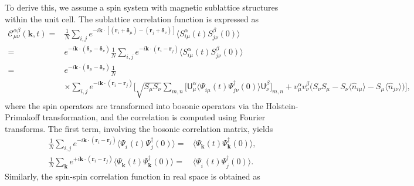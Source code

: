 \documentclass[aps, prx, nofootinbib, superscriptaddress]{revtex4-2}
\newcommand{\kvec}{\mathbf{k}}
\begin{document}
To derive this, we assume a spin system with magnetic sublattice structures within the unit cell. The sublattice correlation function is expressed as
\begin{align}
    \mathcal{C}^{\alpha\beta}_{\mu\nu} (\kvec, t) 
    = & \frac{1}{N} \sum_{i,j} e^{ - i \kvec \cdot [(\mathbf{r}_{i} + \mathbf{\delta}_{\mu}) - (\mathbf{r}_{j} + \mathbf{\delta}_{\nu})]} \langle S_{i\mu}^{\alpha}(t) S_{j\nu}^{\beta}(0) \rangle \\
    = & e^{ - i \kvec \cdot (\mathbf{\delta}_{\mu} - \mathbf{\delta}_{\nu})}  
    \frac{1}{N} \sum_{i,j} e^{ - i \kvec \cdot (\mathbf{r}_{i} - \mathbf{r}_{j} )} 
    \langle S_{i\mu}^{\alpha}(t) S_{j\nu}^{\beta}(0) \rangle \\
    = & e^{ - i \kvec \cdot (\mathbf{\delta}_{\mu} - \mathbf{\delta}_{\nu})}  
    \frac{1}{N}  \\
    & \times \sum_{i,j} e^{ - i \kvec \cdot (\mathbf{r}_{i} - \mathbf{r}_{j} )} 
    \bigg[
    \sqrt{S_{\mu}S_{\nu}} \sum_{m,n}
    \Big[ \mathsf{U}^{\alpha}_{\mu}
    \big\langle \Psi_{i\mu}^{\phantom \dagger}(t) \Psi_{j\nu}^{\dagger}(0) \big\rangle
    \mathsf{U}^{\beta}_{\nu} \Big]_{m,n} 
    + v_{\mu}^{\alpha} v_{\nu}^{\beta}
    \Big( S_{\nu} S_{\mu} - S_{\nu}\langle \hat{n}_{i\mu} \rangle - S_{\mu}\langle \hat{n}_{j\nu} \rangle \Big)
    \bigg], 
    \nonumber
\end{align}
where the spin operators are transformed into bosonic operators via the Holstein-Primakoff transformation, and the correlation is computed using Fourier transforms. The first term, involving the bosonic correlation matrix, yields
\begin{subequations}
    \begin{align}
        \frac{1}{N} \sum_{i,j}   
        e^{ - i \kvec \cdot (\mathbf{r}_{i} - \mathbf{r}_{j} )} 
        \big\langle \Psi_{i}^{\phantom \dagger}(t) \Psi_{j}^{\dagger}(0) \big\rangle 
        = &
        \big\langle \Psi_{\kvec}^{\phantom \dagger}(t) \Psi_{\kvec}^{\dagger}(0) \big\rangle,
        \\
        \frac{1}{N} \sum_{\kvec} 
        e^{ + i \kvec \cdot (\mathbf{r}_{i} - \mathbf{r}_{j} )} 
        \big\langle \Psi_{\kvec}^{\phantom \dagger}(t) \Psi_{\kvec}^{\dagger}(0) \big\rangle 
        = &
        \big\langle \Psi_{i}^{\phantom \dagger}(t) \Psi_{j}^{\dagger}(0) \big\rangle.
    \end{align}
\end{subequations}
Similarly, the spin-spin correlation function in real space is obtained as
\end{document}
